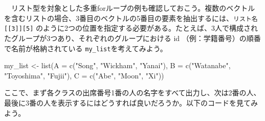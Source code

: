 \documentclass[
  a4paper,
  pandoc,
  ja=standard,
  jafont=haranoaji]{bxjsbook}
\newenvironment{Shaded}{\begin{snugshade}}{\end{snugshade}}
\newcommand{\AttributeTok}[1]{\textcolor[rgb]{0.00,0.48,0.65}{#1}}
\newcommand{\ControlFlowTok}[1]{\textcolor[rgb]{0.00,0.48,0.65}{#1}}
\newcommand{\DecValTok}[1]{\textcolor[rgb]{0.68,0.00,0.00}{#1}}
\newcommand{\FunctionTok}[1]{\textcolor[rgb]{0.28,0.35,0.67}{#1}}
\newcommand{\NormalTok}[1]{\textcolor[rgb]{0.00,0.48,0.65}{#1}}
\newcommand{\OtherTok}[1]{\textcolor[rgb]{0.00,0.48,0.65}{#1}}
\newcommand{\SpecialCharTok}[1]{\textcolor[rgb]{0.37,0.37,0.37}{#1}}
\newcommand{\StringTok}[1]{\textcolor[rgb]{0.13,0.47,0.30}{#1}}
\begin{document}
\begin{Shaded}
\end{Shaded}

　リスト型を対象とした多重forループの例も確認しておこう。複数のベクトルを含むリストの場合、3番目のベクトルの5番目の要素を抽出するには、\texttt{リスト名{[}{[}3{]}{]}{[}5{]}}
のように2つの位置を指定する必要がある。たとえば、3人で構成されたグループが3つあり、それぞれのグループにおける
id （例：学籍番号）の順番で名前が格納されている
\texttt{my\_list}を考えてみよう。

\begin{Shaded}
\begin{Highlighting}[numbers=left,,]
\NormalTok{my\_list }\OtherTok{\textless{}{-}} \FunctionTok{list}\NormalTok{(}\AttributeTok{A =} \FunctionTok{c}\NormalTok{(}\StringTok{"Song"}\NormalTok{, }\StringTok{"Wickham"}\NormalTok{, }\StringTok{"Yanai"}\NormalTok{),}
                \AttributeTok{B =} \FunctionTok{c}\NormalTok{(}\StringTok{"Watanabe"}\NormalTok{, }\StringTok{"Toyoshima"}\NormalTok{, }\StringTok{"Fujii"}\NormalTok{),}
                \AttributeTok{C =} \FunctionTok{c}\NormalTok{(}\StringTok{"Abe"}\NormalTok{, }\StringTok{"Moon"}\NormalTok{, }\StringTok{"Xi"}\NormalTok{))}
\end{Highlighting}
\end{Shaded}

ここで、まず各クラスの出席番号1番の人の名字をすべて出力し、次は2番の人、最後に3番の人を表示するにはどうすれば良いだろうか。以下のコードを見てみよう。
\end{document}
